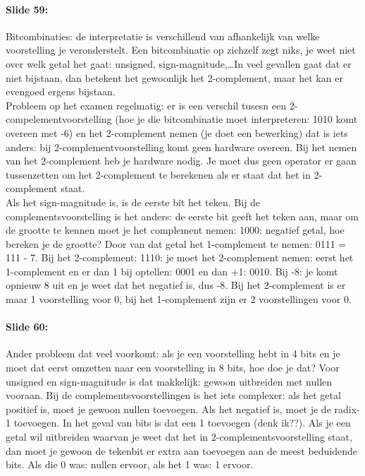 \documentclass[10pt,a4paper]{book}
\begin{document}
\paragraph{Slide 59:} Bitcombinaties: de interpretatie is verschillend van afhankelijk van welke voorstelling je veronderstelt. Een bitcombinatie op zichzelf zegt niks, je weet niet over welk getal het gaat: unsigned, sign-magnitude,\ldots In veel gevallen gaat dat er niet bijstaan, dan betekent het gewoonlijk het 2-complement, maar het kan er evengoed ergens bijstaan.\\
Probleem op het examen regelmatig: er is een verschil tusesn een 2-compelementvoorstelling (hoe je die bitcombinatie moet interpreteren: 1010 komt overeen met -6) en het 2-complement nemen (je doet een bewerking) dat is iets anders: bij 2-complementvoorstelling komt geen hardware overeen. Bij het nemen van het 2-complement heb je hardware nodig. Je moet dus geen operator er gaan tussenzetten om het 2-complement te berekenen als er staat dat het in 2-complement staat.\\
Als het sign-magnitude is, is de eerste bit het teken. Bij de complementsvoorstelling is het anders: de eerste bit geeft het teken aan, maar om de grootte te kennen moet je het complement nemen: 1000: negatief getal, hoe bereken je de grootte? Door van dat getal het 1-complement te nemen: 0111 = 111 - 7. Bij het 2-complement: 1110: je moet het 2-complement nemen: eerst het 1-complement en er dan 1 bij optellen: 0001 en dan +1: 0010. Bij -8: je komt opnieuw 8 uit en je weet dat het negatief is, dus -8. Bij het 2-complement is er maar 1 voorstelling voor 0, bij het 1-complement zijn er 2 voorstellingen voor 0.

\paragraph{Slide 60:} Ander probleem dat veel voorkomt: als je een voorstelling hebt in 4 bits en je moet dat eerst omzetten naar een voorstelling in 8 bits, hoe doe je dat? Voor unsigned en sign-magnitude is dat makkelijk: gewoon uitbreiden met nullen vooraan. Bij de complementsvoorstellingen is het iets complexer: als het getal positief is, moet je gewoon nullen toevoegen. Als het negatief is, moet je de radix-1 toevoegen. In het geval van bits is dat een 1 toevoegen (denk ik??). Als je een getal wil uitbreiden waarvan je weet dat het in 2-complementsvoorstelling staat, dan moet je gewoon de tekenbit er extra aan toevoegen aan de meest beduidende bits. Als die 0 was: nullen ervoor, als het 1 was: 1 ervoor.
\end{document}
